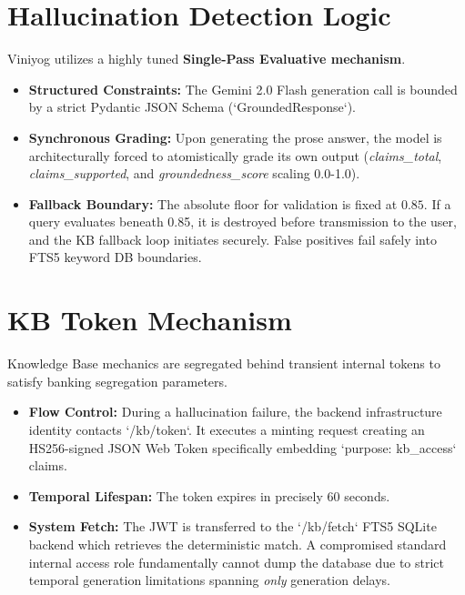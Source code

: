 \documentclass[11pt,a4paper]{article}
\begin{document}
\section{Hallucination Detection Logic}
Viniyog utilizes a highly tuned \textbf{Single-Pass Evaluative mechanism}. 
\begin{itemize}
    \item \textbf{Structured Constraints:} The Gemini 2.0 Flash generation call is bounded by a strict Pydantic JSON Schema (`GroundedResponse`). 
    \item \textbf{Synchronous Grading:} Upon generating the prose answer, the model is architecturally forced to atomistically grade its own output (\textit{claims\_total}, \textit{claims\_supported}, and \textit{groundedness\_score} scaling 0.0-1.0).
    \item \textbf{Fallback Boundary:} The absolute floor for validation is fixed at $0.85$. If a query evaluates beneath 0.85, it is destroyed before transmission to the user, and the KB fallback loop initiates securely. False positives fail safely into FTS5 keyword DB boundaries.
\end{itemize}

\section{KB Token Mechanism}
Knowledge Base mechanics are segregated behind transient internal tokens to satisfy banking segregation parameters.
\begin{itemize}
    \item \textbf{Flow Control:} During a hallucination failure, the backend infrastructure identity contacts `/kb/token`. It executes a minting request creating an HS256-signed JSON Web Token specifically embedding `purpose: kb_access` claims.
    \item \textbf{Temporal Lifespan:} The token expires in precisely 60 seconds.
    \item \textbf{System Fetch:} The JWT is transferred to the `/kb/fetch` FTS5 SQLite backend which retrieves the deterministic match. A compromised standard internal access role fundamentally cannot dump the database due to strict temporal generation limitations spanning \textit{only} generation delays.
\end{itemize}
\end{document}
